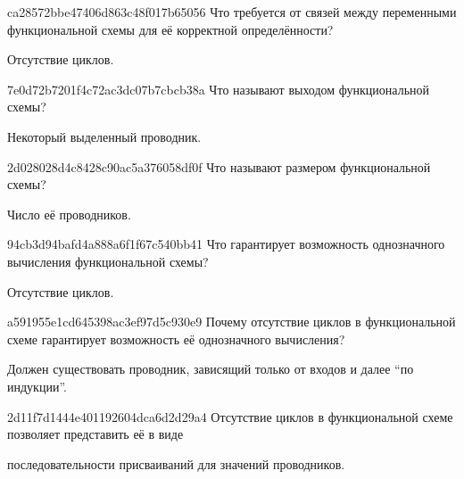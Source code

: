 \begin{note}{ca28572bbe47406d863c48f017b65056}
    Что требуется от связей между переменными функциональной схемы для её корректной определённости?

    \begin{cloze}{1}
        Отсутствие циклов.
    \end{cloze}
\end{note}

\begin{note}{7e0d72b7201f4c72ac3dc07b7cbcb38a}
    Что называют выходом функциональной схемы?

    \begin{cloze}{1}
        Некоторый выделенный проводник.
    \end{cloze}
\end{note}

\begin{note}{2d028028d4c8428c90ac5a376058df0f}
    Что называют размером функциональной схемы?

    \begin{cloze}{1}
        Число её проводников.
    \end{cloze}
\end{note}

\begin{note}{94cb3d94bafd4a888a6f1f67c540bb41}
    Что гарантирует возможность однозначного вычисления функциональной схемы?

    \begin{cloze}{1}
        Отсутствие циклов.
    \end{cloze}
\end{note}

\begin{note}{a591955e1cd645398ac3ef97d5c930e9}
    Почему отсутствие циклов в функциональной схеме гарантирует возможность её однозначного вычисления?

    \begin{cloze}{1}
        Должен существовать проводник, зависящий только от входов и далее ``по индукции''.
    \end{cloze}
\end{note}

\begin{note}{2d11f7d1444e401192604dca6d2d29a4}
    Отсутствие циклов в функциональной схеме позволяет представить её в виде \begin{icloze}{1}последовательности присваиваний для значений проводников.\end{icloze}
\end{note}

